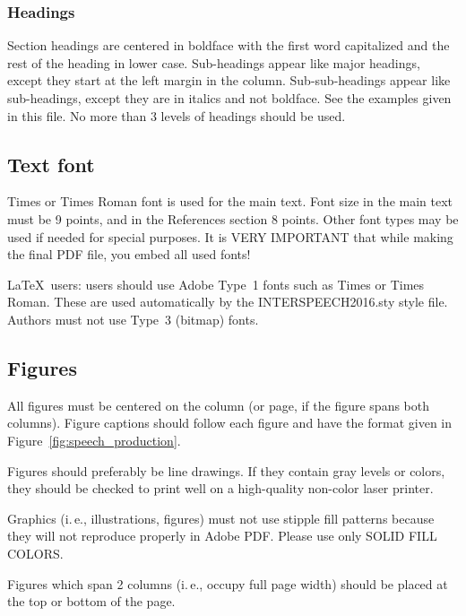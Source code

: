\documentclass[a4paper]{article}
\begin{document}
      \subsubsection{Headings}

        Section headings are centered in boldface with the first word capitalized and the rest of the heading in lower case.
        Sub-headings appear like major headings, except they start at the left margin in the column.
        Sub-sub-headings appear like sub-headings, except they are in italics and not boldface. 
        See the examples given in this file. 
        No more than 3 levels of headings should be used.

  
    \subsection{Text font}

      Times or Times Roman font is used for the main text. 
      Font size in the main text must be 9 points, and in the References section 8 points. 
      Other font types may be used if needed for special purposes. 
      It is VERY IMPORTANT that while making the final PDF file, you embed all used fonts!

      \LaTeX\ users: users should use Adobe Type~1 fonts such as Times or Times Roman. 
      These are used automatically by the INTERSPEECH2016.sty style file. 
      Authors must not use Type~3 (bitmap) fonts.

  
    \subsection{Figures}

      All figures must be centered on the column (or page, if the figure spans both columns).
      Figure captions should follow each figure and have the format given in Figure~\ref{fig:speech_production}.

      Figures should preferably be line drawings. 
      If they contain gray levels or colors, they should be checked to print well on a high-quality non-color laser printer.

      Graphics (i.\,e., illustrations, figures) must not use stipple fill patterns because they will not reproduce properly in Adobe PDF.
      Please use only SOLID FILL COLORS.

      Figures which span 2 columns (i.\,e., occupy full page width) should be placed at the top or bottom of the page.
\end{document}
